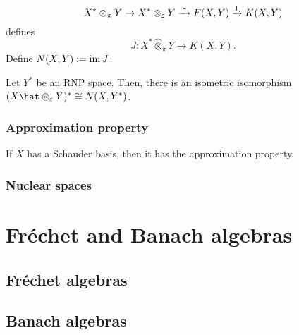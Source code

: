 \documentclass{../../large}
\begin{document}
\begin{prb}
\[X^*\otimes_\pi Y\to X^*\otimes_\varepsilon Y\xrightarrow{\sim} F(X,Y)\xrightarrow{1}K(X,Y)\]
defines
\[J:X^*\hat\otimes_\pi Y\to K(X,Y).\]
Define $N(X,Y):=\operatorname{im} J$.
\end{prb}

\begin{prb}
Let $Y^*$ be an RNP space.
Then, there is an isometric isomorphism $(X\hat\otimes_\e Y)^*\cong N(X,Y^*)$.
\end{prb}

\section{Approximation property}

\begin{prb}
\end{prb}

\begin{prb}
\end{prb}

\begin{prb}
\end{prb}

\begin{prb}
\begin{parts}
\item If $X$ has a Schauder basis, then it has the approximation property.
\end{parts}
\end{prb}



\section{Nuclear spaces}



\part{Fr\'echet and Banach algebras}

\chapter{Fr\'echet algebras}

\chapter{Banach algebras}
\end{document}
